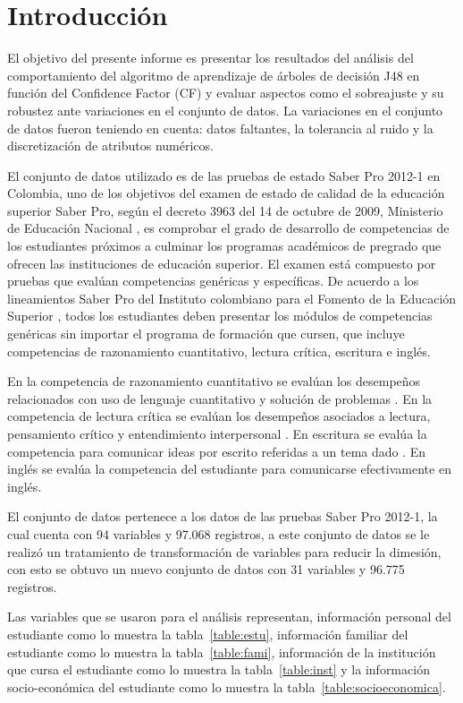 \section{Introducción}

El objetivo del presente informe es presentar los resultados del análisis del
comportamiento del algoritmo de aprendizaje de árboles de decisión J48 en función del
Confidence Factor (CF) y evaluar aspectos como el sobreajuste y su robustez ante
variaciones en el conjunto de datos. La variaciones en el conjunto de datos fueron 
teniendo en cuenta: datos faltantes, la tolerancia al ruido y la
discretización de atributos numéricos.

El conjunto de datos utilizado es de las pruebas de estado Saber Pro 2012-1 en Colombia,
uno de los objetivos del examen de estado de calidad de la educación superior Saber
Pro, según el decreto 3963 del 14 de octubre de 2009, Ministerio de Educación
Nacional \cite{men2009}, es comprobar el grado de desarrollo de competencias de los
estudiantes próximos a culminar los programas académicos de pregrado que ofrecen
las instituciones de educación superior. El examen está compuesto por pruebas que
evalúan competencias genéricas y específicas. De acuerdo a los lineamientos Saber
Pro del Instituto colombiano para el Fomento de la Educación Superior \cite{icfes2011},
todos los estudiantes deben presentar los módulos de competencias genéricas sin
importar el programa de formación que cursen, que incluye competencias de
razonamiento cuantitativo, lectura crítica, escritura e inglés.

En la competencia de razonamiento cuantitativo se evalúan los desempeños
relacionados con uso de lenguaje cuantitativo y solución de problemas \cite{icfes2012a}.
En la competencia de lectura crítica se evalúan los desempeños asociados a lectura,
pensamiento crítico y entendimiento interpersonal \cite{icfes2012a}. En escritura se
evalúa la competencia para comunicar ideas por escrito referidas a un tema dado
\cite{icfes2011} \cite{icfes2012a}. En inglés se evalúa la competencia del estudiante para
comunicarse efectivamente en inglés.

El conjunto de datos pertenece a los datos de las pruebas Saber Pro 2012-1, la cual cuenta con
94 variables y 97.068 registros, a este conjunto de datos se le realizó un tratamiento de transformación
de variables para reducir la dimesión, con esto se obtuvo un nuevo conjunto de datos con 31 variables y
96.775 registros. 

Las variables que se usaron para el análisis representan, información personal del estudiante como lo muestra
la tabla~\ref{table:estu}, información familiar del estudiante  como lo muestra la tabla~\ref{table:fami},
información de la institución que cursa el estudiante como lo muestra la tabla~\ref{table:inst} y la información socio-económica
del estudiante como lo muestra la tabla~\ref{table:socioeconomica}.



